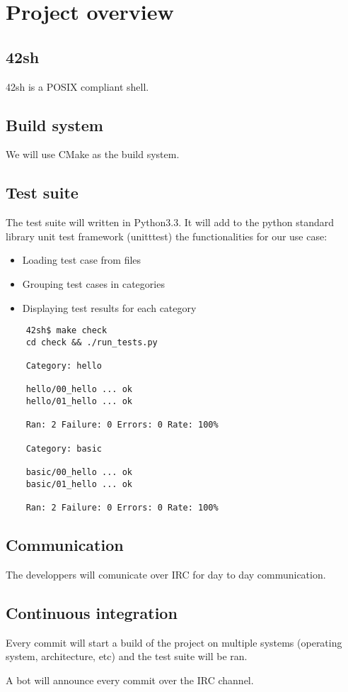 \section{Project overview}

\subsection{42sh}

42sh is a POSIX compliant shell.

\subsection{Build system}

We will use CMake as the build system.

\subsection{Test suite}

The test suite will written in Python3.3. It will add to the python standard library
unit test framework (unitttest) the functionalities for our use case:

\begin{itemize}
    \item Loading test case from files
    \item Grouping test cases in categories
    \item Displaying test results for each category
\end{itemize}

\begin{verbatim}
    42sh$ make check
    cd check && ./run_tests.py

    Category: hello

    hello/00_hello ... ok
    hello/01_hello ... ok

    Ran: 2 Failure: 0 Errors: 0 Rate: 100%

    Category: basic

    basic/00_hello ... ok
    basic/01_hello ... ok

    Ran: 2 Failure: 0 Errors: 0 Rate: 100%
\end{verbatim}

\subsection{Communication}

The developpers will comunicate over IRC for day to day communication.

\subsection{Continuous integration}

Every commit will start a build of the project on multiple systems (operating
system, architecture, etc) and the test suite will be ran.

A bot will announce every commit over the IRC channel.
